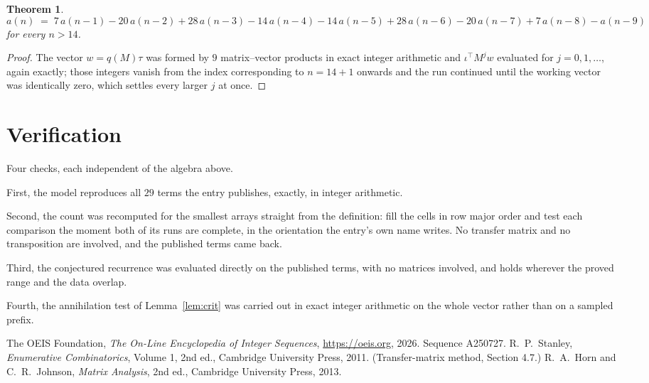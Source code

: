 \documentclass[11pt,a4paper]{article}
\theoremstyle{plain}
\newtheorem{theorem}{Theorem}
\theoremstyle{definition}
\begin{document}
\begin{theorem}
\[
a(n)\;=\;7\,a(n-1) - 20\,a(n-2) + 28\,a(n-3) - 14\,a(n-4) - 14\,a(n-5) + 28\,a(n-6) - 20\,a(n-7) + 7\,a(n-8) - a(n-9)
\]
for every $n>14$.
\end{theorem}

\begin{proof}
The vector $w=q(M)\tau$ was formed by $9$ matrix--vector products in exact integer
arithmetic and $\iota^{\!\top}M^{j}w$ evaluated for $j=0,1,\dots$, again exactly; those
integers vanish from the index corresponding to $n=14+1$ onwards and the run continued
until the working vector was identically zero, which settles every larger $j$ at once.
\end{proof}

\section{Verification}

Four checks, each independent of the algebra above.

First, the model reproduces all $29$ terms the entry publishes, exactly, in integer
arithmetic.

Second, the count was recomputed for the smallest arrays straight from the definition: fill the
cells in row major order and test each comparison the moment both of its runs are complete,
in the orientation the entry's own name writes. No transfer matrix and no transposition are
involved, and the published terms came back.

Third, the conjectured recurrence was evaluated directly on the published terms, with no
matrices involved, and holds wherever the proved range and the data overlap.

Fourth, the annihilation test of Lemma~\ref{lem:crit} was carried out in exact integer
arithmetic on the whole vector rather than on a sampled prefix.

\begin{thebibliography}{9}
 The OEIS Foundation, \emph{The On-Line Encyclopedia of Integer
Sequences}, \url{https://oeis.org}, 2026. Sequence A250727.
 R.~P.~Stanley, \emph{Enumerative Combinatorics}, Volume 1, 2nd ed.,
Cambridge University Press, 2011. (Transfer-matrix method, Section 4.7.)
 R.~A.~Horn and C.~R.~Johnson, \emph{Matrix Analysis}, 2nd ed., Cambridge
University Press, 2013.
\end{thebibliography}
\end{document}
